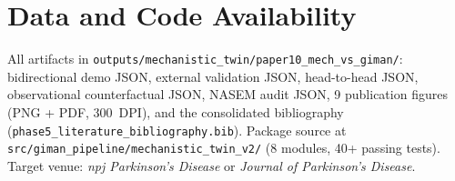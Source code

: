 \section{Data and Code Availability}

All artifacts in \texttt{outputs/mechanistic\_twin/paper10\_mech\_vs\_giman/}:
bidirectional demo JSON, external validation JSON, head-to-head JSON, observational counterfactual JSON, NASEM audit JSON, 9 publication figures (PNG + PDF, 300~DPI), and the consolidated bibliography (\texttt{phase5\_literature\_bibliography.bib}). Package source at \texttt{src/giman\_pipeline/mechanistic\_twin\_v2/} (8 modules, 40+ passing tests). Target venue: \emph{npj Parkinson's Disease} or \emph{Journal of Parkinson's Disease}.
